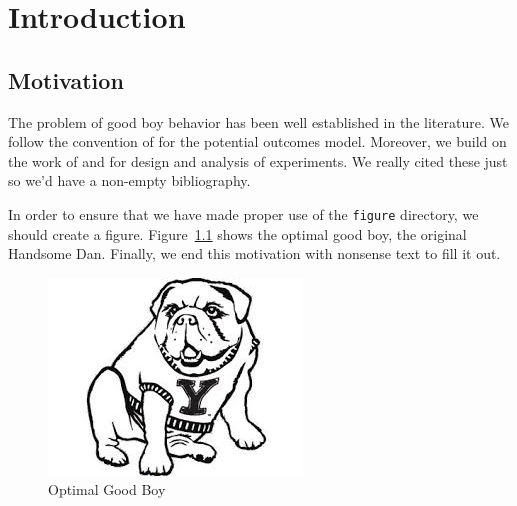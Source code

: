 \chapter{Introduction} \label{chapter:intro}

\section{Motivation}

The problem of good boy behavior has been well established in the literature.
We follow the convention of \citet{Neyman1923Application} for the potential outcomes model.
Moreover, we build on the work of \citet{Harshaw2021Balancing} and \citet{harshaw2021design} for design and analysis of experiments.
We really cited these just so we'd have a non-empty bibliography.

In order to ensure that we have made proper use of the \texttt{figure} directory, we should create a figure.
Figure~\ref{fig:handsome-dan} shows the optimal good boy, the original Handsome Dan.
Finally, we end this motivation with nonsense text to fill it out.

\begin{figure}
	\centering
	\includegraphics{figures/handsome-dan}
	\caption{Optimal Good Boy} \label{fig:handsome-dan}
\end{figure}

\Blindtext